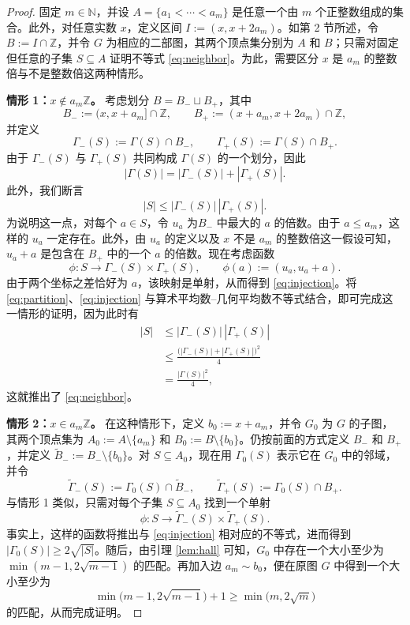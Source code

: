 \documentclass[UTF8,a4paper,oneside,openany,fontset=fandol,zihao=-4]{ctexbook}
\theoremstyle{chinesestyle}
\begin{document}
\begin{proof}
固定 $m\in\mathbb N$，并设 $A=\{a_1<\cdots<a_m\}$ 是任意一个由 $m$ 个正整数组成的集合。此外，对任意实数 $x$，定义区间 $I:=(x,x+2a_m)$。如第 2 节所述，令 $B:=I\cap\mathbb Z$，并令 $G$ 为相应的二部图，其两个顶点集分别为 $A$ 和 $B$；只需对固定但任意的子集 $S\subseteq A$ 证明不等式 \eqref{eq:neighbor}。为此，需要区分 $x$ 是 $a_m$ 的整数倍与不是整数倍这两种情形。

\medskip
\noindent\textbf{情形 1：$x\notin a_m\mathbb Z$。}
考虑划分 $B=B_-\sqcup B_+$，其中
\[
  B_-:=(x,x+a_m]\cap\mathbb Z,
  \qquad
  B_+:=(x+a_m,x+2a_m)\cap\mathbb Z,
\]
并定义
\[
  \Gamma_-(S):=\Gamma(S)\cap B_-,
  \qquad
  \Gamma_+(S):=\Gamma(S)\cap B_+.
\]
由于 $\Gamma_-(S)$ 与 $\Gamma_+(S)$ 共同构成 $\Gamma(S)$ 的一个划分，因此
\begin{equation}
  |\Gamma(S)|=|\Gamma_-(S)|+|\Gamma_+(S)|.
  \tag{3}\label{eq:partition}
\end{equation}
此外，我们断言
\begin{equation}
  |S|\leq |\Gamma_-(S)|\,|\Gamma_+(S)|.
  \tag{4}\label{eq:injection}
\end{equation}
为说明这一点，对每个 $a\in S$，令 $u_a$ 为$B_-$ 中最大的 $a$ 的倍数。由于 $a\leq a_m$，这样的 $u_a$ 一定存在。此外，由 $u_a$ 的定义以及 $x$ 不是 $a_m$ 的整数倍这一假设可知，$u_a+a$ 是包含在 $B_+$ 中的一个 $a$ 的倍数。现在考虑函数
\[
  \phi:S\longrightarrow \Gamma_-(S)\times\Gamma_+(S),
  \qquad
  \phi(a):=(u_a,u_a+a).
\]
由于两个坐标之差恰好为 $a$，该映射是单射，从而得到 \eqref{eq:injection}。将 \eqref{eq:partition}、\eqref{eq:injection} 与算术平均数--几何平均数不等式结合，即可完成这一情形的证明，因为此时有
\[
\begin{aligned}
  |S|
    &\leq |\Gamma_-(S)|\,|\Gamma_+(S)|\\
    &\leq \frac{\bigl(|\Gamma_-(S)|+|\Gamma_+(S)|\bigr)^2}{4}\\
    &=\frac{|\Gamma(S)|^2}{4},
\end{aligned}
\]
这就推出了 \eqref{eq:neighbor}。

\medskip
\noindent\textbf{情形 2：$x\in a_m\mathbb Z$。}
在这种情形下，定义 $b_0:=x+a_m$，并令 $G_0$ 为 $G$ 的子图，其两个顶点集为 $A_0:=A\setminus\{a_m\}$ 和 $B_0:=B\setminus\{b_0\}$。仍按前面的方式定义 $B_-$ 和 $B_+$，并定义 $\widetilde B_-:=B_-\setminus\{b_0\}$。对 $S\subseteq A_0$，现在用 $\Gamma_0(S)$ 表示它在 $G_0$ 中的邻域，并令
\[
  \widetilde\Gamma_-(S):=\Gamma_0(S)\cap\widetilde B_-,
  \qquad
  \widetilde\Gamma_+(S):=\Gamma_0(S)\cap B_+.
\]
与情形 1 类似，只需对每个子集 $S\subseteq A_0$ 找到一个单射
\[
  \phi:S\longrightarrow
    \widetilde\Gamma_-(S)\times\widetilde\Gamma_+(S).
\]
事实上，这样的函数将推出与 \eqref{eq:injection} 相对应的不等式，进而得到 $|\Gamma_0(S)|\geq 2\sqrt{|S|}$。随后，由引理 \ref{lem:hall} 可知，$G_0$ 中存在一个大小至少为 $\min(m-1,2\sqrt{m-1})$ 的匹配。再加入边 $a_m\sim b_0$，便在原图 $G$ 中得到一个大小至少为
\[
  \min\bigl(m-1,2\sqrt{m-1}\bigr)+1
    \geq \min\bigl(m,2\sqrt m\bigr)
\]
的匹配，从而完成证明。


\end{proof}
\end{document}
